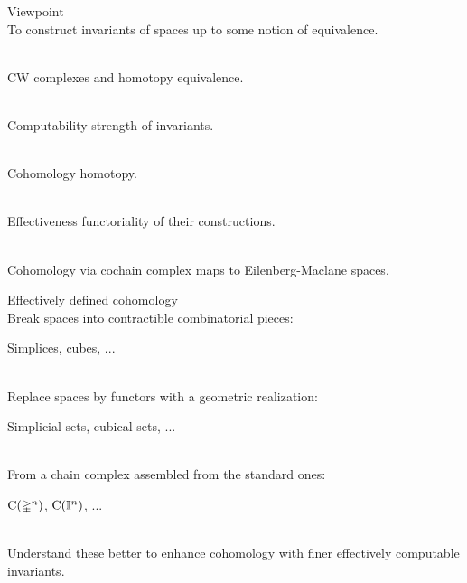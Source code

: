 
\begin{frame}{Viewpoint}
	\pause
	 \\
	To construct invariants of spaces up to some notion of equivalence.

	\bigskip\pause
	 \\
	CW complexes and homotopy equivalence.

	\bigskip\pause
	 \\
	Computability  strength of invariants.

	\bigskip\pause
	 \\
	Cohomology  homotopy.

	\bigskip\pause
	 \\
	Effectiveness  functoriality of their constructions.

	\bigskip\pause
	 \\
	Cohomology via cochain complex  maps to Eilenberg-Maclane spaces.
\end{frame}

\begin{frame}{Effectively defined cohomology}
	\pause
	 \\
	Break spaces into contractible combinatorial pieces: \\
	\begin{center}
		Simplices, cubes, ...
	\end{center}

	\pause
	 \\
	Replace spaces by functors with a geometric realization: \\
	\begin{center}
		Simplicial sets, cubical sets, ...
	\end{center}

	\pause
	 \\
	From a chain complex assembled from the standard ones: \\
	\begin{center}
		$\operatorname{C}(\mathbb{\Delta}^n)$, $\operatorname{C}(\mathbb{I}^n)$, ...
	\end{center}

	\pause
	 \\
	Understand these better to enhance cohomology with finer effectively computable invariants.
\end{frame}